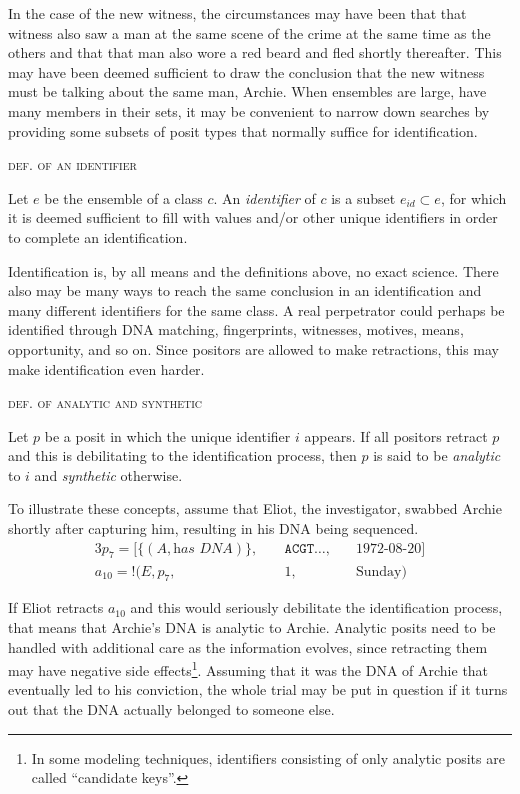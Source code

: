 \documentclass[sfsidenotes,nobib,twoside,symmetric]{tufte-handout}
\newcommand{\assert}{\text{!}}
\newcounter{majorcount}
\newcommand{\deffy}[3]{
	\vspace{2ex}
	\refstepcounter{majorcount} 
	\noindent\textsc{#1}%
	\\\begin{small}
	\noindent #2%
	\label{Def:#3}
	\end{small}
	\vspace{2ex}
}
\begin{document}
In the case of the new witness, the circumstances may have been that that witness also saw a man at the same scene of the crime at the same time as the others and that that man also wore a red beard and fled shortly thereafter. This may have been deemed sufficient to draw the conclusion that the new witness must be talking about the same man, Archie. When ensembles are large, have many members in their sets, it may be convenient to narrow down searches by providing some subsets of posit types that normally suffice for identification.

\deffy{def. of an identifier}{%
Let $e$ be the ensemble of a class $c$. An \emph{identifier} of $c$ is a subset $e_{id} \subset e$, for which it is deemed sufficient to fill with values and/or other unique identifiers in order to complete an identification.
}{identifier}

Identification is, by all means and the definitions above, no exact science. There also may be many ways to reach the same conclusion in an identification and many different identifiers for the same class. A real perpetrator could perhaps be identified through DNA matching, fingerprints, witnesses, motives, means, opportunity, and so on. Since positors are allowed to make retractions, this may make identification even harder. 

\deffy{def. of analytic and synthetic}{%
Let $p$ be a posit in which the unique identifier $i$ appears. If all positors retract $p$ and this is debilitating to the identification process, then $p$ is said to be \emph{analytic} to $i$ and \emph{synthetic} otherwise.
}{anasyn}

To illustrate these concepts, assume that Eliot, the investigator, swabbed Archie shortly after capturing him, resulting in his DNA being sequenced. 
\begin{alignat*}{3}
p_{7} = [\{(A, \textit{has DNA})\},\;&& \texttt{ACGT\ldots},\;&& \textrm{1972-08-20}]  \\
a_{10} = \assert(E, p_{7},\;&& 1,\;&& \textrm{Sunday}) 
\end{alignat*}

If Eliot retracts $a_{10}$ and this would seriously debilitate the identification process, that means that Archie's DNA is analytic to Archie. Analytic posits need to be handled with additional care as the information evolves, since retracting them may have negative side effects\footnote{In some modeling techniques, identifiers consisting of only analytic posits are called \enquote{candidate keys}.}. Assuming that it was the DNA of Archie that eventually led to his conviction, the whole trial may be put in question if it turns out that the DNA actually belonged to someone else.
\end{document}
